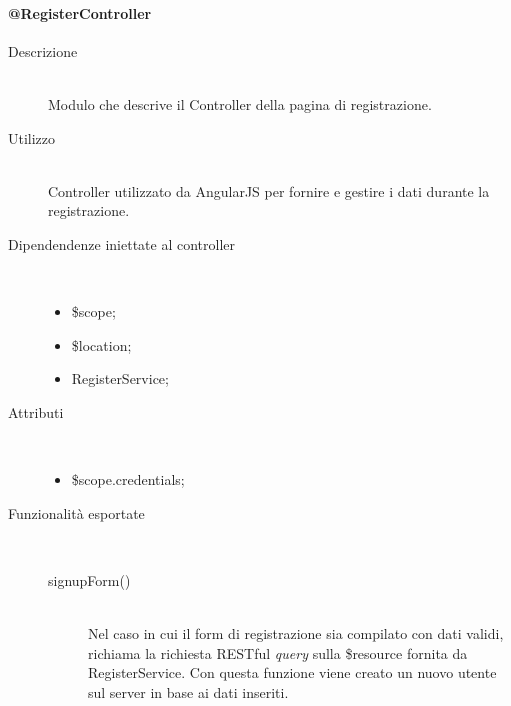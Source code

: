 \paragraph{@RegisterController}
\begin{description}
 \item[Descrizione] \hfill \\
 Modulo che descrive il Controller della pagina di registrazione.
 
 \item[Utilizzo] \hfill \\
 Controller utilizzato da AngularJS per fornire e gestire i dati durante la registrazione.
 
 \item[Dipendendenze iniettate al controller] \hfill \\
 \begin{itemize}
  \item \$scope;
  \item \$location;
  \item RegisterService;
  
 \end{itemize}
 
 \item[Attributi] \hfill \\
 \begin{itemize}
 \item  \$scope.credentials;
 \end{itemize}
 
 \item[Funzionalità esportate] \hfill \\
 \begin{description}
  \item[ signupForm()] \hfill \\
  Nel caso in cui il form di registrazione sia compilato con dati validi, richiama la richiesta RESTful \textit{query} sulla \$resource 
  fornita da RegisterService.
  Con questa funzione viene creato un nuovo utente sul server in base ai dati inseriti.
 
  
 \end{description}
\end{description}


